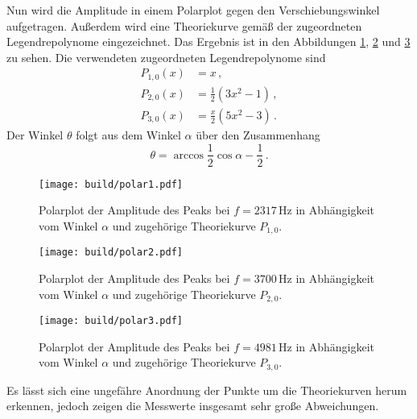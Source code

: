 Nun wird die Amplitude in einem Polarplot gegen den Verschiebungswinkel aufgetragen.
Außerdem wird eine Theoriekurve gemäß der zugeordneten Legendrepolynome eingezeichnet.
Das Ergebnis ist in den Abbildungen \ref{fig:polar1}, \ref{fig:polar2} und
\ref{fig:polar3} zu sehen. Die verwendeten zugeordneten Legendrepolynome sind
\begin{align*}
	P_{1,0}(x)&=x \,,\\
	P_{2,0}(x)&=\frac{1}{2}(3x^2-1) \,,\\
	P_{3,0}(x)&=\frac{x}{2}(5x^2-3) \,.
\end{align*}
Der Winkel $\theta$ folgt aus dem Winkel $\alpha$ über den Zusammenhang
\begin{equation*}
	\theta=\arccos{\frac{1}{2}\cos{\alpha}-\frac{1}{2}} \,.
\end{equation*}

\begin{figure}
  \centering
  \texttt{[image: build/polar1.pdf]}
  \caption{Polarplot der Amplitude des Peaks bei $f=2317$\,Hz in Abhängigkeit vom
  Winkel $\alpha$ und zugehörige Theoriekurve $P_{1,0}$.}
  \label{fig:polar1}
\end{figure}
\begin{figure}
  \centering
  \texttt{[image: build/polar2.pdf]}
  \caption{Polarplot der Amplitude des Peaks bei $f=3700$\,Hz in Abhängigkeit vom
  Winkel $\alpha$ und zugehörige Theoriekurve $P_{2,0}$.}
  \label{fig:polar2}
\end{figure}
\begin{figure}
  \centering
  \texttt{[image: build/polar3.pdf]}
  \caption{Polarplot der Amplitude des Peaks bei $f=4981$\,Hz in Abhängigkeit vom
  Winkel $\alpha$ und zugehörige Theoriekurve $P_{3,0}$.}
  \label{fig:polar3}
\end{figure}

Es lässt sich eine ungefähre Anordnung der Punkte um die Theoriekurven herum erkennen,
jedoch zeigen die Messwerte insgesamt sehr große Abweichungen.
